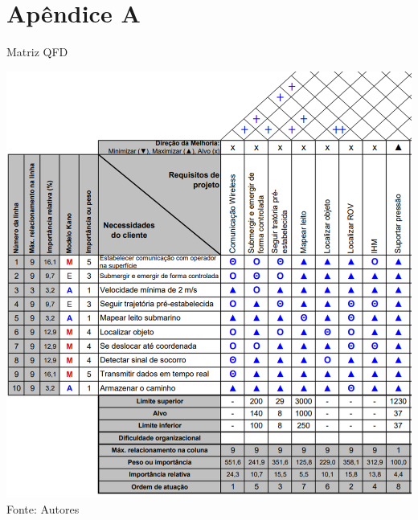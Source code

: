 \section{Apêndice A}

\begin{table}[h]
	\centering
	\caption{Matriz QFD}
	\label{tab:qfd-brov}
	\includegraphics[width=1\linewidth]{images/QFD-BROV}\\
	\footnotesize Fonte: Autores
\end{table}